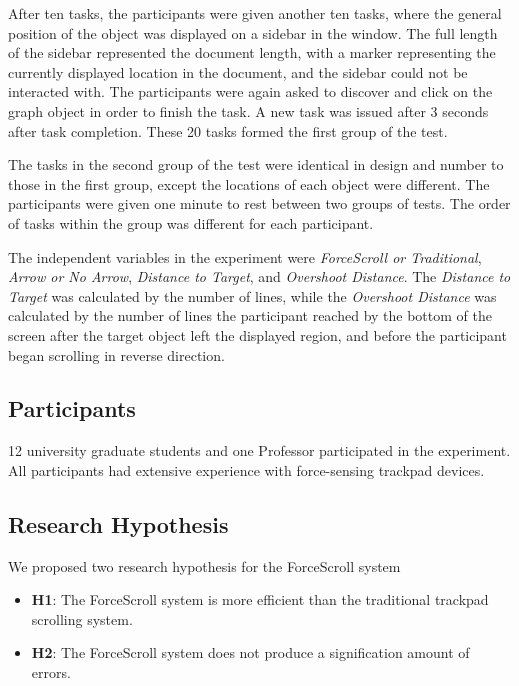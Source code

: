 \documentclass{sigchi}
\begin{document}
After ten tasks, the participants were given another ten tasks, where the general position of the object was displayed on a sidebar in the window. The full length of the sidebar represented the document length, with a marker representing the currently displayed location in the document, and the sidebar could not be interacted with. The participants were again asked to discover and click on the graph object in order to finish the task. A new task was issued after 3 seconds after task completion. These 20 tasks formed the first group of the test. 

The tasks in the second group of the test were identical in design and number to those in the first group, except the locations of each object were different. The participants were given one minute to rest between two groups of tests. The order of tasks within the group was different for each participant.

The independent variables in the experiment were \textit{ForceScroll or Traditional}, \textit{Arrow or No Arrow}, \textit{Distance to Target}, and \textit{Overshoot Distance}. The \textit{Distance to Target} was calculated by the number of lines, while the \textit{Overshoot Distance} was calculated by the number of lines the participant reached by the bottom of the screen after the target object left the displayed region, and before the participant began scrolling in reverse direction.   

\subsection{Participants}
12 university graduate students and one Professor participated in the experiment. All participants had extensive experience with force-sensing trackpad devices. 
    
\subsection{Research Hypothesis}

We proposed two research hypothesis for the ForceScroll system

\begin{itemize}
	\item \textbf{H1}: The ForceScroll system is more efficient than the traditional trackpad scrolling system.
	\item \textbf{H2}: The ForceScroll system does not produce a signification amount of errors.
\end{itemize}
\end{document}
